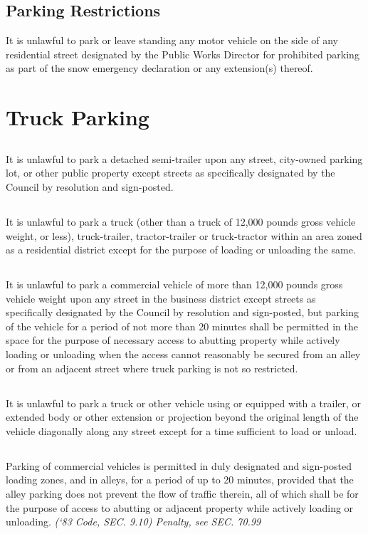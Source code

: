 \subsection{Parking Restrictions}
It is unlawful to park or leave standing any motor vehicle on the side of any residential street designated by the Public Works Director for prohibited parking as part of the snow emergency declaration or any extension(s) thereof.

\section{Truck Parking}
\subsection{}
It is unlawful to park a detached semi-trailer upon any street, city-owned parking lot, or other public property except streets as specifically designated by the Council by resolution and sign-posted.
\subsection{}
It is unlawful to park a truck (other than a truck of 12,000 pounds gross vehicle weight, or less), truck-trailer, tractor-trailer or truck-tractor within an area zoned as a residential district except for the purpose of loading or unloading the same.
\subsection{}
It is unlawful to park a commercial vehicle of more than 12,000 pounds gross vehicle weight upon any street in the business district except streets as specifically designated by the Council by resolution and sign-posted, but parking of the vehicle for a period of not more than 20 minutes shall be permitted in the space for the purpose of necessary access to abutting property while actively loading or unloading when the access cannot reasonably be secured from an alley or from an adjacent street where truck parking is not so restricted.
\subsection{}
It is unlawful to park a truck or other vehicle using or equipped with a trailer, or extended body or other extension or projection beyond the original length of the vehicle diagonally along any street except for a time sufficient to load or unload.
\subsection{}
Parking of commercial vehicles is permitted in duly designated and sign-posted loading zones, and in alleys, for a period of up to 20 minutes, provided that the alley parking does not prevent the flow of traffic therein, all of which shall be for the purpose of access to abutting or adjacent property while actively loading or unloading.\newline
\emph{(‘83 Code, SEC. 9.10)  Penalty, see SEC. 70.99}

